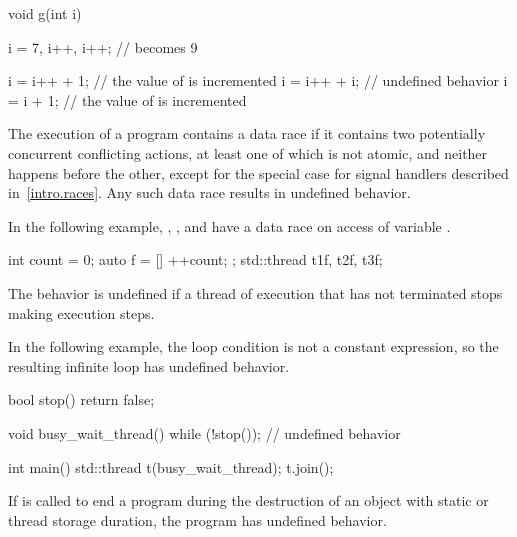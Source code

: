 \pnum
\begin{example}
\begin{codeblock}
void g(int i) {
  i = 7, i++, i++;  //  becomes 9

  i = i++ + 1;  // the value of  is incremented
  i = i++ + i;  // undefined behavior
  i = i + 1;    // the value of  is incremented
}
\end{codeblock}
\end{example}


\pnum
The execution of a program contains a data race
if it contains two potentially concurrent conflicting actions,
at least one of which is not atomic,
and neither happens before the other,
except for the special case for signal handlers
described in~\ref{intro.races}.
Any such data race results in undefined behavior.

\pnum
\begin{example}
In the following example,
, , and 
have a data race on access of variable .
\begin{codeblock}
int count = 0;
auto f = [] { ++count; };
std::thread t1{f}, t2{f}, t3{f};
\end{codeblock}
\end{example}


\pnum
The behavior is undefined if a thread of execution
that has not terminated stops making execution steps.

\pnum
\begin{example}
In the following example,
the loop condition 
is not a constant expression,
so the resulting infinite loop
has undefined behavior.
\begin{codeblock}
bool stop() { return false; }

void busy_wait_thread() {
  while (!stop());  // undefined behavior
}

int main() {
  std::thread t(busy_wait_thread);
  t.join();
}
\end{codeblock}
\end{example}


\pnum
If  is called to
end a program during the destruction of an object with static or thread storage duration, the program has
undefined behavior.

